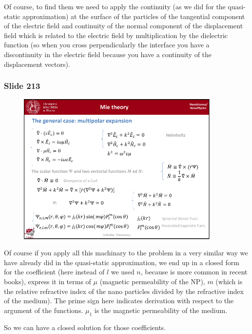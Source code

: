 \documentclass[../main/main.tex]{subfiles}
\begin{document}
Of course, to find them we need to apply the continuity (as we did for the quasi-static approximation) at the surface of the particles of the tangential component of the electric field and continuity of the normal component of the displacement field which is related to the electric field by multiplication by the dielectric function (so when you cross perpendicularly the interface you have a discontinuity in the electric field because you have a continuity of the displacement vectors).

\newpage

\subsubsection{Slide 213}

\begin{figure}[h!]
\centering
\includegraphics[page=6,width=0.9\textwidth]{../lessons/pdf_file/13_lesson.pdf}
\end{figure}

Of course if you apply all this machinary to the problem in a very similar way we have already did in the quasi-static approximation, we end up in a closed form for the coefficient (here instead of $l$ we used $n$, because is more common in recent books), express it in terms of $\mu$ (magnetic permeability of the NP), $m$ (which is the relative refractive index of the nano particles divided by the refractive index of the medium).
The prime sign here indicates derivation with respect to the argument of the functions. \( \mu _1 \) is the magnetic permeability of the medium.

So we can have a closed solution for those coefficients.
\end{document}
